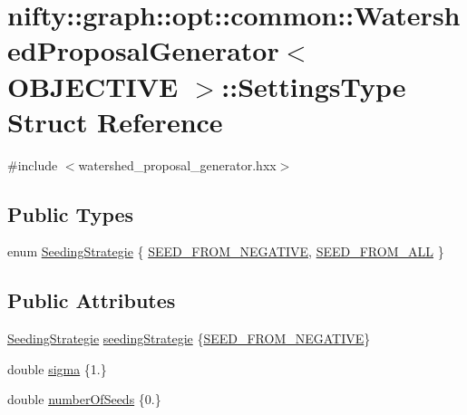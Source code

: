 \hypertarget{structnifty_1_1graph_1_1opt_1_1common_1_1WatershedProposalGenerator_1_1SettingsType}{}\section{nifty\+:\+:graph\+:\+:opt\+:\+:common\+:\+:Watershed\+Proposal\+Generator$<$ O\+B\+J\+E\+C\+T\+I\+VE $>$\+:\+:Settings\+Type Struct Reference}
\label{structnifty_1_1graph_1_1opt_1_1common_1_1WatershedProposalGenerator_1_1SettingsType}


{\ttfamily \#include $<$watershed\+\_\+proposal\+\_\+generator.\+hxx$>$}

\subsection*{Public Types}
\begin{DoxyCompactItemize}
\item 
enum \hyperlink{structnifty_1_1graph_1_1opt_1_1common_1_1WatershedProposalGenerator_1_1SettingsType_a3e291dc78a9f6ed9d97571bd2f41cfc0}{Seeding\+Strategie} \{ \hyperlink{structnifty_1_1graph_1_1opt_1_1common_1_1WatershedProposalGenerator_1_1SettingsType_a3e291dc78a9f6ed9d97571bd2f41cfc0a8238d8eb40d79bbdcdf578ef51e2e097}{S\+E\+E\+D\+\_\+\+F\+R\+O\+M\+\_\+\+N\+E\+G\+A\+T\+I\+VE}, 
\hyperlink{structnifty_1_1graph_1_1opt_1_1common_1_1WatershedProposalGenerator_1_1SettingsType_a3e291dc78a9f6ed9d97571bd2f41cfc0a1aa350eb05135d91d8b65c2a0f17df21}{S\+E\+E\+D\+\_\+\+F\+R\+O\+M\+\_\+\+A\+LL}
 \}
\end{DoxyCompactItemize}
\subsection*{Public Attributes}
\begin{DoxyCompactItemize}
\item 
\hyperlink{structnifty_1_1graph_1_1opt_1_1common_1_1WatershedProposalGenerator_1_1SettingsType_a3e291dc78a9f6ed9d97571bd2f41cfc0}{Seeding\+Strategie} \hyperlink{structnifty_1_1graph_1_1opt_1_1common_1_1WatershedProposalGenerator_1_1SettingsType_a4da332a9f085ceac68bf607a328b95ee}{seeding\+Strategie} \{\hyperlink{structnifty_1_1graph_1_1opt_1_1common_1_1WatershedProposalGenerator_1_1SettingsType_a3e291dc78a9f6ed9d97571bd2f41cfc0a8238d8eb40d79bbdcdf578ef51e2e097}{S\+E\+E\+D\+\_\+\+F\+R\+O\+M\+\_\+\+N\+E\+G\+A\+T\+I\+VE}\}
\item 
double \hyperlink{structnifty_1_1graph_1_1opt_1_1common_1_1WatershedProposalGenerator_1_1SettingsType_ab7ed4ca5e846638b1fc8b71bc02f79e9}{sigma} \{1.\}
\item 
double \hyperlink{structnifty_1_1graph_1_1opt_1_1common_1_1WatershedProposalGenerator_1_1SettingsType_aea461ec3982d8079bbca97f7179d22ae}{number\+Of\+Seeds} \{0.\}
\end{DoxyCompactItemize}


